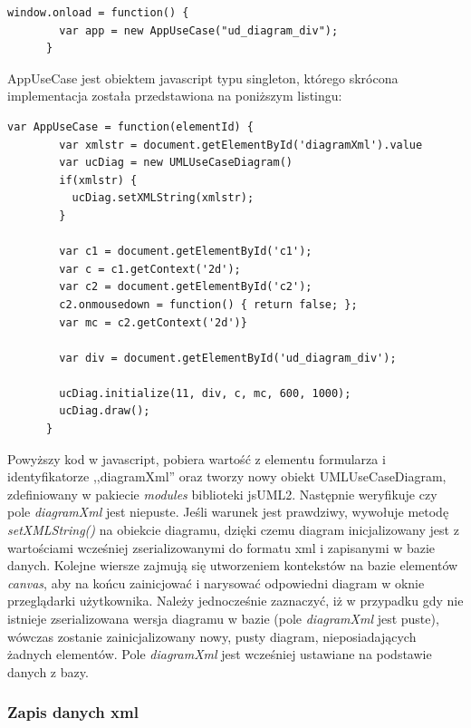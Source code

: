       \begin{lstlisting}[caption={widok requriement/edit.gsp}, label={lst:appUseCase}]
      window.onload = function() {
        var app = new AppUseCase("ud_diagram_div");
      }

      \end{lstlisting}

      AppUseCase jest obiektem javascript typu singleton, którego skrócona implementacja została przedstawiona na poniższym listingu: 
    
      \begin{lstlisting}[caption={implementacja obiektu JS AppUseCase}, label={lst:appUseCaseImpl}]
      var AppUseCase = function(elementId) { 
        var xmlstr = document.getElementById('diagramXml').value
        var ucDiag = new UMLUseCaseDiagram() 
        if(xmlstr) {
          ucDiag.setXMLString(xmlstr);
        }

        var c1 = document.getElementById('c1');
        var c = c1.getContext('2d');
        var c2 = document.getElementById('c2');
        c2.onmousedown = function() { return false; };
        var mc = c2.getContext('2d')}

        var div = document.getElementById('ud_diagram_div');

        ucDiag.initialize(11, div, c, mc, 600, 1000);
        ucDiag.draw();
      }
      \end{lstlisting}

      Powyższy kod w javascript, pobiera wartość z elementu formularza i identyfikatorze ,,diagramXml'' oraz tworzy nowy obiekt UMLUseCaseDiagram, zdefiniowany w pakiecie \emph{modules} biblioteki jsUML2. Następnie weryfikuje czy pole \emph{diagramXml} jest niepuste. Jeśli warunek jest prawdziwy, wywołuje metodę \emph{setXMLString()} na obiekcie diagramu, dzięki czemu diagram inicjalizowany jest z wartościami wcześniej zserializowanymi do formatu xml i zapisanymi w bazie danych. Kolejne wiersze zajmują się utworzeniem kontekstów na bazie elementów \emph{canvas}, aby na końcu zainicjować i narysować odpowiedni diagram w oknie przeglądarki użytkownika. Należy jednocześnie zaznaczyć, iż w przypadku gdy nie istnieje zserializowana wersja diagramu w bazie (pole \emph{diagramXml} jest puste), wówczas zostanie zainicjalizowany nowy, pusty diagram, nieposiadających żadnych elementów. Pole \emph{diagramXml} jest wcześniej ustawiane na podstawie danych z bazy.

      \subsubsection{Zapis danych xml}

